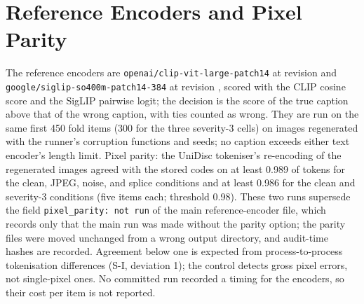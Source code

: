 \documentclass[journal,onecolumn]{IEEEtran}
\theoremstyle{plain}
\begin{document}
\section{Reference Encoders and Pixel Parity}\label{sup:baselines}
The reference encoders are \nolinkurl{openai/clip-vit-large-patch14} at revision \texttt{} and
\nolinkurl{google/siglip-so400m-patch14-384} at revision \texttt{}, scored with the CLIP cosine score and
the SigLIP pairwise logit; the decision is the score of the true caption above that of the wrong caption, with ties counted as wrong.
They are run on the same first 450 fold items (300 for the three severity-3 cells) on images regenerated with the runner's corruption
functions and seeds; no caption exceeds either text encoder's length limit.
Pixel parity: the UniDisc tokeniser's re-encoding of the regenerated images agreed with the stored codes on at least 0.989 of tokens for the
clean, JPEG, noise, and splice conditions and at least 0.986 for the clean and severity-3 conditions (five items each; threshold 0.98).
These two runs supersede the field \texttt{pixel\_parity: not run} of the main reference-encoder file, which records only that the main run
was made without the parity option; the parity files were moved unchanged from a wrong output directory, and audit-time hashes are
recorded.
Agreement below one is expected from process-to-process tokenisation differences (S-I, deviation 1); the control detects gross
pixel errors, not single-pixel ones.
No committed run recorded a timing for the encoders, so their cost per item is not reported.

\end{document}

